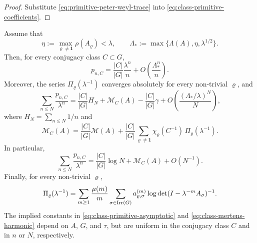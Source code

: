 \begin{proof}
  Substitute \eqref{eq:primitive-peter-weyl-trace} into
  \eqref{eq:class-primitive-coefficients}.
\end{proof}

\begin{theorem}
  \label{thm:class-mertens-explicit}
  Assume that
  \[
    \eta:=\max_{\varrho\neq\mathbf 1}\rho(A_\varrho)<\lambda,
    \qquad
    \Lambda_*:=\max\{\Lambda(A),\eta,\lambda^{1/2}\}.
  \]
  Then, for every conjugacy class \(C\subset G\),
  \begin{equation}\label{eq:class-primitive-asymptotic}
    p_{n,C}
    =
    \frac{|C|}{|G|}\frac{\lambda^n}{n}
    +O\!\left(\frac{\Lambda_*^n}{n}\right).
  \end{equation}
  Moreover, the series \(\Pi_\varrho(\lambda^{-1})\) converges
  absolutely for every non-trivial \(\varrho\), and
  \begin{equation}\label{eq:class-mertens-harmonic}
    \sum_{n\le N}\frac{p_{n,C}}{\lambda^n}
    =
    \frac{|C|}{|G|}H_N
    +\mathcal M_C(A)-\frac{|C|}{|G|}\gamma
    +O\!\left(\frac{(\Lambda_*/\lambda)^N}{N}\right),
  \end{equation}
  where \(H_N=\sum_{n\le N}1/n\) and
  \begin{equation}\label{eq:class-mertens-constant}
    \mathcal M_C(A)
    =
    \frac{|C|}{|G|}\mathcal M(A)
    +\frac{|C|}{|G|}
      \sum_{\varrho\neq\mathbf 1}
        \chi_\varrho(C^{-1})\,\Pi_\varrho(\lambda^{-1}).
  \end{equation}
  In particular,
  \begin{equation}\label{eq:class-mertens-log}
    \sum_{n\le N}\frac{p_{n,C}}{\lambda^n}
    =
    \frac{|C|}{|G|}\log N+\mathcal M_C(A)+O(N^{-1}).
  \end{equation}
  Finally, for every non-trivial \(\varrho\),
  \begin{equation}\label{eq:class-mertens-determinant}
    \Pi_\varrho(\lambda^{-1})
    =
    \sum_{m\ge 1}\frac{\mu(m)}{m}
      \sum_{\sigma\in\operatorname{Irr}(G)}
        a_{\varrho,\sigma}^{(m)}
        \log\det(I-\lambda^{-m}A_\sigma)^{-1}.
  \end{equation}
  The implied constants in
  \eqref{eq:class-primitive-asymptotic} and
  \eqref{eq:class-mertens-harmonic} depend on \(A\), \(G\), and
  \(\tau\), but are uniform in the conjugacy class \(C\) and in \(n\)
  or \(N\), respectively.
\end{theorem}

